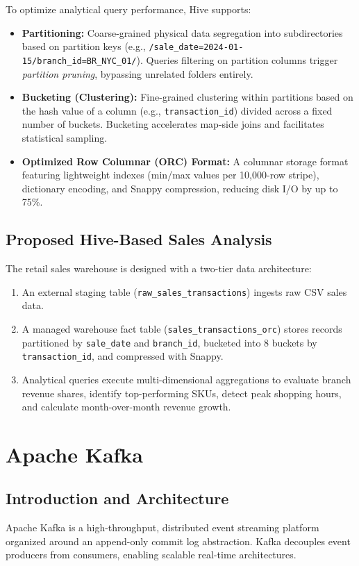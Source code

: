 \documentclass[12pt,a4paper]{report}
\begin{document}
To optimize analytical query performance, Hive supports:
\begin{itemize}
    \item \textbf{Partitioning:} Coarse-grained physical data segregation into subdirectories based on partition keys (e.g., \texttt{/sale\_date=2024-01-15/branch\_id=BR\_NYC\_01/}). Queries filtering on partition columns trigger \textit{partition pruning}, bypassing unrelated folders entirely.
    \item \textbf{Bucketing (Clustering):} Fine-grained clustering within partitions based on the hash value of a column (e.g., \texttt{transaction\_id}) divided across a fixed number of buckets. Bucketing accelerates map-side joins and facilitates statistical sampling.
    \item \textbf{Optimized Row Columnar (ORC) Format:} A columnar storage format featuring lightweight indexes (min/max values per 10,000-row stripe), dictionary encoding, and Snappy compression, reducing disk I/O by up to 75\%.
\end{itemize}

\subsection{Proposed Hive-Based Sales Analysis}
The retail sales warehouse is designed with a two-tier data architecture:
\begin{enumerate}
    \item An external staging table (\texttt{raw\_sales\_transactions}) ingests raw CSV sales data.
    \item A managed warehouse fact table (\texttt{sales\_transactions\_orc}) stores records partitioned by \texttt{sale\_date} and \texttt{branch\_id}, bucketed into 8 buckets by \texttt{transaction\_id}, and compressed with Snappy.
    \item Analytical queries execute multi-dimensional aggregations to evaluate branch revenue shares, identify top-performing SKUs, detect peak shopping hours, and calculate month-over-month revenue growth.
\end{enumerate}

\section{Apache Kafka}
\subsection{Introduction and Architecture}
Apache Kafka is a high-throughput, distributed event streaming platform organized around an append-only commit log abstraction. Kafka decouples event producers from consumers, enabling scalable real-time architectures.
\end{document}
